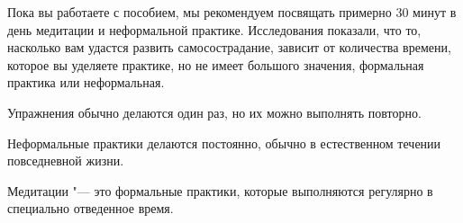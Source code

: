 	Пока вы работаете с пособием, мы рекомендуем посвящать примерно 30 минут в день медитации и неформальной практике. Исследования показали, что то, насколько вам удастся развить самосострадание, зависит от количества времени, которое вы уделяете практике, но не имеет большого значения, формальная практика или неформальная.  
	
	Упражнения обычно делаются один раз, но их можно выполнять повторно.
	
	Неформальные практики делаются постоянно, обычно в естественном течении повседневной жизни.
	
	Медитации "--- это формальные практики, которые выполняются регулярно в специально отведенное время. 
